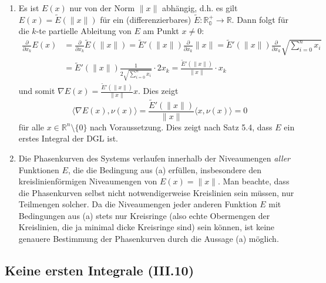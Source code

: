 \documentclass[a4paper]{article}
\begin{document}
\begin{enumerate}[label=(\alph*)]
    \item Es ist $E(x)$ nur von der Norm $\|x\|$ abhängig, d.h. es gilt $E(x) = \tilde{E}(\|x\|)$ für ein (differenzierbares) $\tilde{E}: \mathds{R^+_0} \to \mathds{R}$. Dann folgt für die $k$-te partielle Ableitung von $E$ am Punkt $x \neq 0$:
    \begin{align*}
        \frac{\partial}{\partial x_k} E (x) &= \frac{\partial}{\partial x_k} \tilde{E}(\|x\|) = \tilde{E}'(\|x\|) \frac{\partial}{\partial x_k} \|x\| = \tilde{E}'(\|x\|) \frac{\partial}{\partial x_k} \sqrt{\sum_{i = 0}^n x_i} \\
        &= \tilde{E}'(\|x\|) \frac{1}{2 \sqrt{\sum_{i = 0}^n x_i}}  \cdot 2 x_k =  \frac{\tilde{E}'(\|x\|)}{\|x\|} \cdot x_k
    \end{align*}
    und somit $\nabla E(x) = \frac{\tilde{E}'(\|x\|)}{\|x\|} x$. Dies zeigt 
    \begin{equation*}
        \langle \nabla E(x), \nu(x) \rangle = \frac{\tilde{E}'(\|x\|)}{\|x\|} \langle x, \nu(x) \rangle = 0
    \end{equation*}
    für alle $x \in \mathds{R}^n \setminus \{0\}$ nach Voraussetzung. Dies zeigt nach Satz 5.4, dass $E$ ein erstes Integral der DGL ist.
    \item Die Phasenkurven des Systems verlaufen innerhalb der Niveaumengen \textit{aller} Funktionen $E$, die die Bedingung aus (a) erfüllen, insbesondere den kreislinienförmigen Niveaumengen von $E(x) = \|x\|$. Man beachte, dass die Phasenkurven selbst nicht notwendigerweise Kreislinien sein müssen, nur Teilmengen solcher.
    Da die Niveaumengen jeder anderen Funktion $E$ mit Bedingungen aus (a) stets nur Kreisringe (also echte Obermengen der Kreislinien, die ja minimal dicke Kreisringe sind) sein können, ist keine genauere Bestimmung der Phasenkurven durch die Aussage (a) möglich.
\end{enumerate}

\subsection{Keine ersten Integrale (III.10)}
\end{document}
